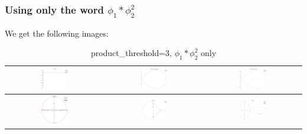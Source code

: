 \documentclass[a4paper,10pt]{article}
\begin{document}
 \subsubsection{Using only the word $\phi_1*\phi_2^2$}
 We get the following images:
 \begin{table}[!ht]
 \caption{product\_threshold=3, $\phi_1*\phi_2^2$ only}
 \begin{tabular}{|c|c|c|}
  \hline
  \includegraphics[width=0.3\textwidth]{PT_3_z1_1-1_2-2.png} &
  \includegraphics[width=0.3\textwidth]{PT_3_C1z1_1-1_2-2.png} &
  \includegraphics[width=0.3\textwidth]{PT_3_C2z1_1-1_2-2.png} \\ \hline
  \includegraphics[width=0.3\textwidth]{PT_3_z2_1-1_2-2.png} &
  \includegraphics[width=0.3\textwidth]{PT_3_zed_C0_1-1_2-2.png} &
  \includegraphics[width=0.3\textwidth]{PT_3_zed_1-1_2-2.png} \\ \hline
 \end{tabular}
 \end{table}
 
\end{document}
